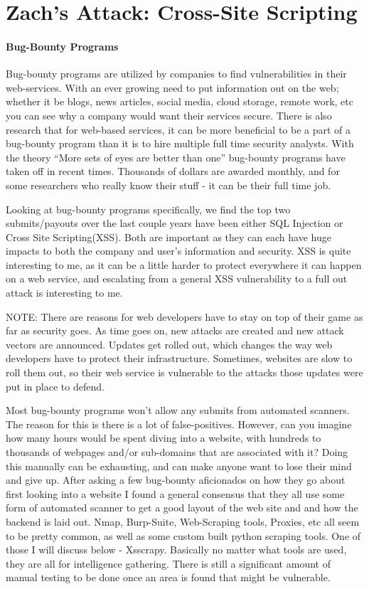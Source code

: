 \section{Zach's Attack: Cross-Site Scripting}
\paragraph{Bug-Bounty Programs}
Bug-bounty programs are utilized by companies to find vulnerabilities in their web-services.  With an ever growing need to put information out on the web; whether it be blogs, news articles, social media, cloud storage, remote work, etc you can see why a company would want their services secure. There is also research that for web-based services, it can be more beneficial to be a part of a bug-bounty program than it is to hire multiple full time security analysts.  With the theory “More sets of eyes are better than one” bug-bounty programs have taken off in recent times.  Thousands of dollars are awarded monthly, and for some researchers who really know their stuff - it can be their full time job.

Looking at bug-bounty programs specifically, we find the top two submits/payouts over the last couple years have been either SQL Injection or Cross Site Scripting(XSS).  Both are important as they can each have huge impacts to both the company and user’s information and security.  XSS is quite interesting to me, as it can be a little harder to protect everywhere it can happen on a web service, and escalating from a general XSS vulnerability to a full out attack is interesting to me.


NOTE: There are reasons for web developers have to stay on top of their game as far as security goes.  As time goes on, new attacks are created and new attack vectors are announced.  Updates get rolled out, which changes the way web developers have to protect their infrastructure. Sometimes, websites are slow to roll them out, so their web service is vulnerable to the attacks those updates were put in place to defend.

Most bug-bounty programs won’t allow any submits from automated scanners.  The reason for this is there is a lot of false-positives.  However, can you imagine how many hours would be spent diving into a website, with hundreds to thousands of webpages and/or sub-domains that are associated with it?  Doing this manually can be exhausting, and can make anyone want to lose their mind and give up.  After asking a few bug-bounty aficionados on how they go about first looking into a website I found a general consensus that they all use some form of automated scanner to get a good layout of the web site and and how the backend is laid out. Nmap, Burp-Suite, Web-Scraping tools, Proxies, etc all seem to be pretty common, as well as some custom built python scraping tools.  One of those I will discuss below - Xsscrapy.  Basically no matter what tools are used, they are all for intelligence gathering.  There is still a significant amount of manual testing to be done once an area is found that might be vulnerable.

